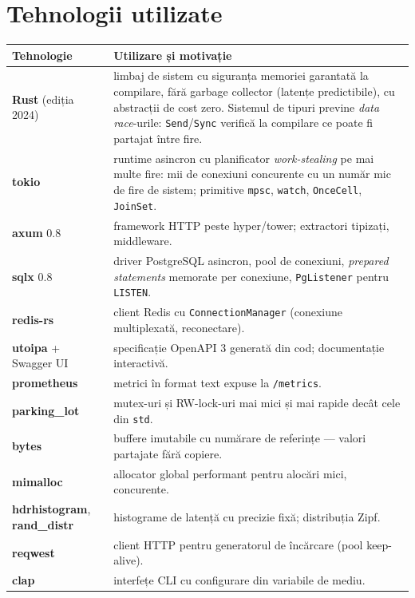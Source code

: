 \chapter{Tehnologii utilizate}
\label{ch:tehnologii}

\begin{table}[H]
\centering\footnotesize
\renewcommand{\arraystretch}{1.05}
\begin{tabularx}{\linewidth}{@{}p{38mm}X@{}}
\toprule
Tehnologie & Utilizare și motivație \\
\midrule
\textbf{Rust} (ediția 2024) & limbaj de sistem cu siguranța memoriei garantată la compilare, fără
  garbage collector (latențe predictibile), cu abstracții de cost zero. Sistemul de tipuri previne
  \emph{data race}-urile: \texttt{Send}/\texttt{Sync} verifică la compilare ce poate fi partajat între fire. \\
\textbf{tokio} & runtime asincron cu planificator \emph{work-stealing} pe mai multe fire: mii de conexiuni
  concurente cu un număr mic de fire de sistem; primitive \texttt{mpsc}, \texttt{watch}, \texttt{OnceCell},
  \texttt{JoinSet}. \\
\textbf{axum} 0.8 & framework HTTP peste hyper/tower; extractori tipizați, middleware. \\
\textbf{sqlx} 0.8 & driver PostgreSQL asincron, pool de conexiuni, \emph{prepared statements} memorate per
  conexiune, \texttt{PgListener} pentru \texttt{LISTEN}. \\
\textbf{redis-rs} & client Redis cu \texttt{ConnectionManager} (conexiune multiplexată, reconectare). \\
\textbf{utoipa} + Swagger UI & specificație OpenAPI 3 generată din cod; documentație interactivă. \\
\textbf{prometheus} & metrici în format text expuse la \texttt{/metrics}. \\
\textbf{parking\_lot} & mutex-uri și RW-lock-uri mai mici și mai rapide decât cele din \texttt{std}. \\
\textbf{bytes} & buffere imutabile cu numărare de referințe — valori partajate fără copiere. \\
\textbf{mimalloc} & allocator global performant pentru alocări mici, concurente. \\
\textbf{hdrhistogram}, \textbf{rand\_distr} & histograme de latență cu precizie fixă; distribuția Zipf. \\
\textbf{reqwest} & client HTTP pentru generatorul de încărcare (pool keep-alive). \\
\textbf{clap} & interfețe CLI cu configurare din variabile de mediu. \\

\end{tabularx}
\end{table}
